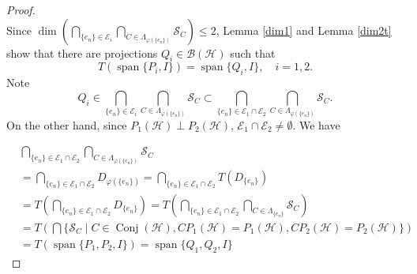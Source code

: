 \documentclass[11pt]{amsart}
\theoremstyle{remark}
\newcommand{\BH}{\mathcal{B(H)}}
\newcommand{\cH}{{\mathcal{H}}}
\newcommand{\SC}{\mathcal{S}_C}
\newcommand{\Conj}{\operatorname{Conj}(\cH)}
\newcommand{\Span}{\operatorname{span}}
\begin{document}
\begin{proof}
\begin{equation*}
\end{equation*}
Since $\dim (\bigcap_{\{e_n\} \in \mathcal{E}_i} \bigcap_{C \in \Lambda_{\varphi(\{e_n\})}}\SC) \le 2$,  Lemma \ref{dim1} and Lemma \ref{dim2t} show that there are projections $Q_i \in \BH$ such that 
\[
T(\Span\{P_i, I\})=\Span\{Q_i, I\}, \quad i=1,2.
\]
Note 
\begin{equation}\label{Q1Q2}
    Q_i \in \bigcap_{\{e_n\} \in \mathcal{E}_i} \bigcap_{C \in \Lambda_{\varphi(\{e_n\})}}\SC \subset \bigcap_{\{e_n\} \in \mathcal{E}_1 \cap \mathcal{E}_2}\bigcap_{C \in \Lambda_{\varphi(\{e_n\})}}\SC.
\end{equation}
On the other hand, since $P_1(\cH) \perp P_2(\cH)$, $\mathcal{E}_1 \cap \mathcal{E}_2 \neq \emptyset$. We have

\begin{equation*}
    \begin{split}
&\bigcap_{\{e_n\} \in \mathcal{E}_1 \cap \mathcal{E}_2}\bigcap_{C \in \Lambda_{\varphi(\{e_n\})}}\SC\\&=\bigcap_{\{e_n\} \in \mathcal{E}_1 \cap \mathcal{E}_2}D_{\varphi(\{e_n\})}=\bigcap_{\{e_n\} \in \mathcal{E}_1 \cap \mathcal{E}_2}T(D_{\{e_n\}})\\&=T(\bigcap_{\{e_n\} \in \mathcal{E}_1 \cap \mathcal{E}_2}D_{\{e_n\}})=T(\bigcap_{\{e_n\} \in \mathcal{E}_1 \cap \mathcal{E}_2}\bigcap_{C \in \Lambda_{\{e_n\}}}\SC)\\&=T(\bigcap \{\SC \mid  C \in \Conj, CP_1(\cH)=P_1(\cH), CP_2(\cH)=P_2(\cH)\})\\&=T(\Span\{ P_1, P_2, I\})=\Span\{ Q_1, Q_2, I\}
        \end{split}
\end{equation*}

\end{proof}
\end{document}
